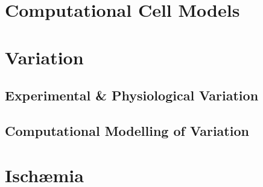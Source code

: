 \documentclass[../thesis-main.tex]{subfiles}
\begin{document}
 \section{Computational Cell Models}
 \label{sec:cell-models}
 
 \section{Variation}
 \label{sec:param-var}
 
 \subsection{Experimental \& Physiological Variation}
 \label{subsec:experimental-var}
 
 \subsection{Computational Modelling of Variation}
 \label{subsec:comp-var}
 
 \section{Isch\ae mia}
 \label{sec:ischaemia}
 
\end{document}
